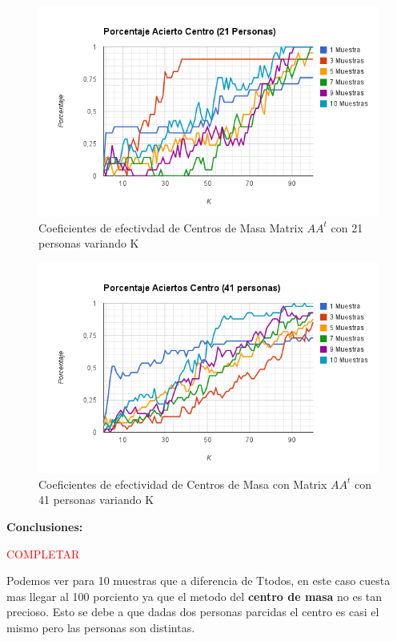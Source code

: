 \begin{figure}[H]
\includegraphics[width=1\textwidth]{img/imagen.png}
     \caption{Coeficientes de efectivdad de Centros de Masa Matrix $AA^t$ con 21 personas variando K}
\end{figure}

\begin{figure}[H]
\includegraphics[width=1\textwidth]{img/imager.png}
     \caption{Coeficientes de efectividad de Centros de Masa con Matrix $AA^t$ con 41 personas variando K}
\end{figure}

\textbf{Conclusiones:}

\textcolor{red}{COMPLETAR}

Podemos ver para 10 muestras que a diferencia de Ttodos, en este caso cuesta mas llegar al 100 porciento ya que el metodo del \textbf{centro de masa} no es tan precioso. Esto se debe a que dadas dos personas parcidas el centro es casi el mismo pero las personas son distintas.



